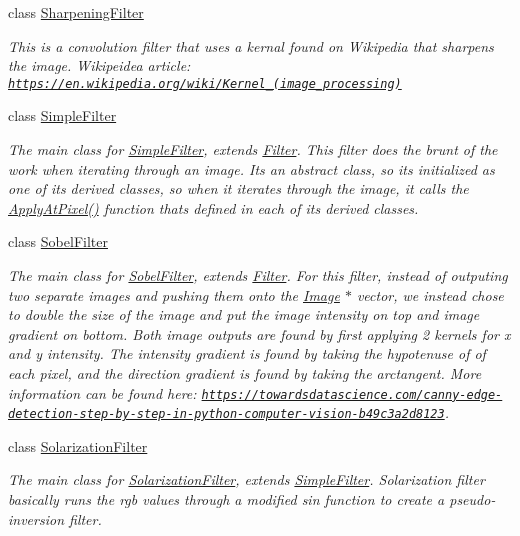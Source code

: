 \begin{DoxyCompactItemize}
class \hyperlink{classSharpeningFilter}{Sharpening\+Filter}
\begin{DoxyCompactList}\small\item\em This is a convolution filter that uses a kernal found on Wikipedia that sharpens the image. Wikipeidea article\+: \href{https://en.wikipedia.org/wiki/Kernel_(image_processing)}{\tt https\+://en.\+wikipedia.\+org/wiki/\+Kernel\+\_\+(image\+\_\+processing)} \end{DoxyCompactList}\item 
class \hyperlink{classSimpleFilter}{Simple\+Filter}
\begin{DoxyCompactList}\small\item\em The main class for \hyperlink{classSimpleFilter}{Simple\+Filter}, extends \hyperlink{classFilter}{Filter}. This filter does the brunt of the work when iterating through an image. It\textquotesingle{}s an abstract class, so it\textquotesingle{}s initialized as one of it\textquotesingle{}s derived classes, so when it iterates through the image, it calls the \hyperlink{classSimpleFilter_ad47d7f994aa0f80f9013d689b82a0b92}{Apply\+At\+Pixel()} function that\textquotesingle{}s defined in each of it\textquotesingle{}s derived classes. \end{DoxyCompactList}\item 
class \hyperlink{classSobelFilter}{Sobel\+Filter}
\begin{DoxyCompactList}\small\item\em The main class for \hyperlink{classSobelFilter}{Sobel\+Filter}, extends \hyperlink{classFilter}{Filter}. For this filter, instead of outputing two separate images and pushing them onto the \hyperlink{classImage}{Image} $\ast$ vector, we instead chose to double the size of the image and put the image intensity on top and image gradient on bottom. Both image outputs are found by first applying 2 kernels for x and y intensity. The intensity gradient is found by taking the hypotenuse of of each pixel, and the direction gradient is found by taking the arctangent. More information can be found here\+: \href{https://towardsdatascience.com/canny-edge-detection-step-by-step-in-python-computer-vision-b49c3a2d8123}{\tt https\+://towardsdatascience.\+com/canny-\/edge-\/detection-\/step-\/by-\/step-\/in-\/python-\/computer-\/vision-\/b49c3a2d8123}. \end{DoxyCompactList}\item 
class \hyperlink{classSolarizationFilter}{Solarization\+Filter}
\begin{DoxyCompactList}\small\item\em The main class for \hyperlink{classSolarizationFilter}{Solarization\+Filter}, extends \hyperlink{classSimpleFilter}{Simple\+Filter}. Solarization filter basically runs the rgb values through a modified sin function to create a pseudo-\/inversion filter. \end{DoxyCompactList}\item 

\end{DoxyCompactItemize}
